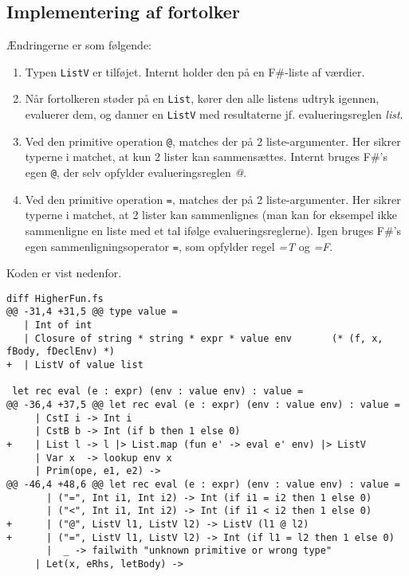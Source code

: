 \subsection{Implementering af fortolker}

Ændringerne er som følgende:

\begin{enumerate}
    \item Typen \texttt{ListV} er tilføjet. Internt holder den på en F\#-liste af værdier.
    \item Når fortolkeren støder på en \texttt{List}, kører den alle listens udtryk igennen, evaluerer dem, og danner en \texttt{ListV} med resultaterne jf. evalueringsreglen \textit{list}.
    \item Ved den primitive operation \texttt{@}, matches der på 2 liste-argumenter. Her sikrer typerne i matchet, at kun 2 lister kan sammensættes. Internt bruges F\#'s egen \texttt{@}, der selv opfylder evalueringsreglen \textit{@}.
    \item Ved den primitive operation \texttt{=}, matches der på 2 liste-argumenter. Her sikrer typerne i matchet, at 2 lister kan sammenlignes (man kan for eksempel ikke sammenligne en liste med et tal ifølge evalueringsreglerne). Igen bruges F\#'s egen sammenligningsoperator \texttt{=}, som opfylder regel \textit{=T} og \textit{=F}.
\end{enumerate}

Koden er vist nedenfor.

\begin{verbatim}
diff HigherFun.fs
@@ -31,4 +31,5 @@ type value =
   | Int of int
   | Closure of string * string * expr * value env       (* (f, x, fBody, fDeclEnv) *)
+  | ListV of value list
 
 let rec eval (e : expr) (env : value env) : value =
@@ -36,4 +37,5 @@ let rec eval (e : expr) (env : value env) : value =
     | CstI i -> Int i
     | CstB b -> Int (if b then 1 else 0)
+    | List l -> l |> List.map (fun e' -> eval e' env) |> ListV
     | Var x  -> lookup env x
     | Prim(ope, e1, e2) -> 
@@ -46,4 +48,6 @@ let rec eval (e : expr) (env : value env) : value =
       | ("=", Int i1, Int i2) -> Int (if i1 = i2 then 1 else 0)
       | ("<", Int i1, Int i2) -> Int (if i1 < i2 then 1 else 0)
+      | ("@", ListV l1, ListV l2) -> ListV (l1 @ l2)
+      | ("=", ListV l1, ListV l2) -> Int (if l1 = l2 then 1 else 0)
       |  _ -> failwith "unknown primitive or wrong type"
     | Let(x, eRhs, letBody) -> 
\end{verbatim}

